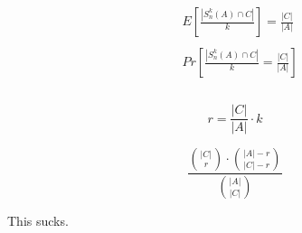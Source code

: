 \begin{align*}
    &E\left[ \frac{|S^{k}_{n}(A) \cap C |}{k}\right] = \frac{|C|}{|A|}\\\\
    &Pr\left[ \frac{|S^{k}_{n}(A) \cap C |}{k} = \frac{|C|}{|A|}\right]\\\\
\end{align*}

\begin{equation}
    r = \frac{|C|}{|A|} \cdot k
\end{equation}

\begin{equation}
    \frac{ {|C|\choose r} \cdot {|A| - r \choose |C| - r}} {{|A| \choose |C|}}
\end{equation}

This sucks.

